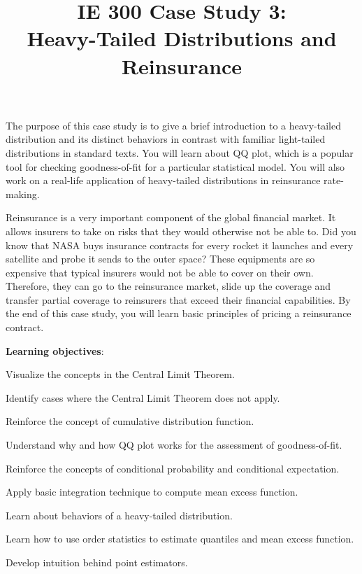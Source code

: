 \documentclass[12pt]{article}
\title{IE 300 Case Study 3:\\Heavy-Tailed Distributions and Reinsurance}
\author{\empty}
\date{\empty}
\begin{document}
\maketitle
\setlength{\parskip}{0.2em}

The purpose of this case study is to give a brief introduction to a heavy-tailed distribution
and its distinct behaviors in contrast with familiar light-tailed distributions in standard texts.
You will learn about QQ plot, which is a popular tool for checking goodness-of-fit for
a particular statistical model. You will also work on a real-life application of heavy-tailed
distributions in reinsurance rate-making.

Reinsurance is a very important component of the global financial market.
It allows insurers to take on risks that they would otherwise not be able to.
Did you know that NASA buys insurance contracts for every rocket it launches
and every satellite and probe it sends to the outer space?
These equipments are so expensive that typical insurers would not be able to cover on their own.
Therefore, they can go to the reinsurance market, slide up the coverage and
transfer partial coverage to reinsurers that exceed their financial capabilities.
By the end of this case study, you will learn basic principles of pricing a reinsurance contract.

\textbf{Learning objectives}:

\begin{tightenum}
\item Visualize the concepts in the Central Limit Theorem.
\item Identify cases where the Central Limit Theorem does not apply.
\item Reinforce the concept of cumulative distribution function.
\item Understand why and how QQ plot works for the assessment of goodness-of-fit.
\item Reinforce the concepts of conditional probability and conditional expectation.
\item Apply basic integration technique to compute mean excess function.
\item Learn about behaviors of a heavy-tailed distribution.
\item Learn how to use order statistics to estimate quantiles and mean excess function.
\item Develop intuition behind point estimators.
\end{tightenum}
\end{document}
